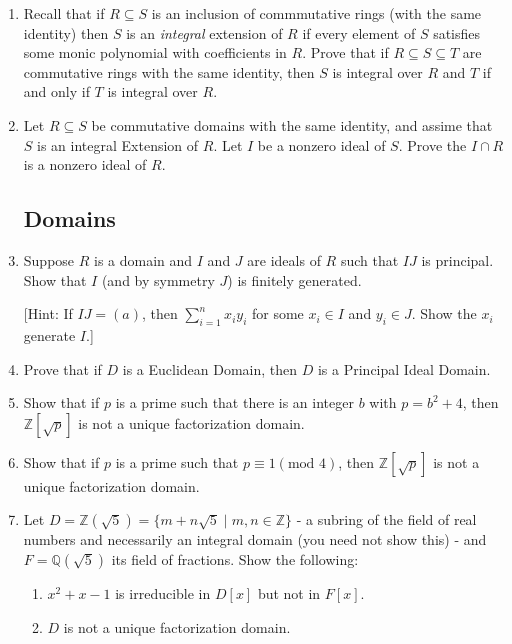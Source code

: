 \documentclass{article}
\theoremstyle{definition}
\newcommand{\m}[1]{(\text{mod }{#1})}
\newcommand{\Z}{\mathbb{Z}}
\newcommand{\Q}{\mathbb{Q}}
\begin{document}
\begin{enumerate}
            \item Recall that if $R\subseteq S$ is an inclusion of commmutative rings (with the same identity) then $S$ is an \textit{integral} extension of $R$ if every element of $S$ satisfies some monic polynomial with coefficients in $R$. Prove that if $R\subseteq S\subseteq T$ are commutative rings with the same identity, then $S$ is integral over $R$ and $T$ if and only if $T$ is integral over $R$.
            
            \item Let $R\subseteq S$ be commutative domains with the same identity, and assime that $S$ is an integral Extension of $R$. Let $I$ be a nonzero ideal of $S$. Prove the $I\cap R$ is a nonzero ideal of $R$.

        \subsection{Domains}

            \item Suppose $R$ is a domain and $I$ and $J$ are ideals of $R$ such that $IJ$ is principal. Show that $I$ (and by symmetry $J$) is finitely generated. 
            
                [Hint: If $IJ=(a)$, then $\sum_{i=1}^n x_iy_i$ for some $x_i\in I$ and $y_i\in J$. Show the $x_i$ generate $I$.]
            
            \item Prove that if $D$ is a Euclidean Domain, then $D$ is a Principal Ideal Domain.
            
            \item Show that if $p$ is a prime such that there is an integer $b$ with $p=b^2+4$, then $\Z[\sqrt{p}]$ is not a unique factorization domain.
            
            \item Show that if $p$ is a prime such that $p\equiv 1 \m{4}$, then $\Z[\sqrt{p}]$ is not a unique factorization domain.
            
            \item Let $D=\Z(\sqrt{5})=\{m+n\sqrt{5}\mid m,n\in \Z\}$ - a subring of the field of real numbers and necessarily an integral domain (you need not show this) - and $F=\Q(\sqrt{5})$ its field of fractions. Show the following:
            
            \begin{enumerate}
                \item $x^2+x-1$ is irreducible in $D[x]$ but not in $F[x]$.
                \item $D$ is not a unique factorization domain.
            \end{enumerate}


\end{enumerate}
\end{document}
